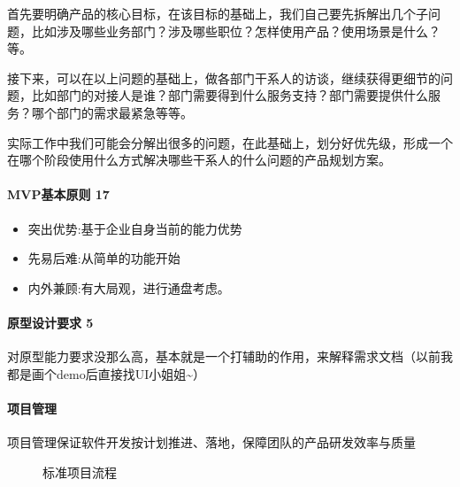 \documentclass[letterpaper,11pt,english]{sphinxmanual}
\begin{document}
首先要明确产品的核心目标，在该目标的基础上，我们自己要先拆解出几个子问题，比如涉及哪些业务部门？涉及哪些职位？怎样使用产品？使用场景是什么？等。

接下来，可以在以上问题的基础上，做各部门干系人的访谈，继续获得更细节的问题，比如部门的对接人是谁？部门需要得到什么服务支持？部门需要提供什么服务？哪个部门的需求最紧急等等。

实际工作中我们可能会分解出很多的问题，在此基础上，划分好优先级，形成一个在哪个阶段使用什么方式解决哪些干系人的什么问题的产品规划方案。


\paragraph{MVP基本原则 17\sphinxfootnotemark[24]}
\label{\detokenize{chapter_introduction/2B:mvp-17}}%
\begin{footnotetext}[24]\sphinxAtStartFootnote
{}
%
\end{footnotetext}\ignorespaces \begin{itemize}
\item {} 
突出优势:基于企业自身当前的能力优势

\item {} 
先易后难:从简单的功能开始

\item {} 
内外兼顾:有大局观，进行通盘考虑。

\end{itemize}


\paragraph{原型设计要求 5\sphinxfootnotemark[25]}
\label{\detokenize{chapter_introduction/2B:id19}}%
\begin{footnotetext}[25]\sphinxAtStartFootnote
{}
%
\end{footnotetext}\ignorespaces 
对原型能力要求没那么高，基本就是一个打辅助的作用，来解释需求文档（以前我都是画个demo后直接找UI小姐姐\textasciitilde{}）


\paragraph{项目管理}
\label{\detokenize{chapter_introduction/2B:id20}}
项目管理保证软件开发按计划推进、落地，保障团队的产品研发效率与质量

\begin{figure}[H]
\centering
\capstart

\noindent{}
\caption{标准项目流程}\label{\detokenize{chapter_introduction/2B:id27}}\end{figure}
\end{document}
